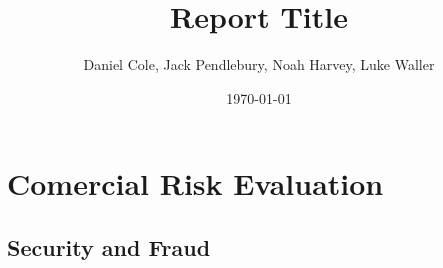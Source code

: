 \documentclass [12pt]{article}
\begin{document}
\title{\bf Report Title}
\author{Daniel Cole, Jack Pendlebury, Noah Harvey, Luke Waller}
\date{\today}
\maketitle
\thispagestyle{empty}

\newpage
{}
\setcounter{page}{1}
\tableofcontents
\newpage

\listoffigures
\listoftables

\newpage
\section{Comercial Risk Evaluation}\label{sec:Commercial_Risk}

\subsection{Security and Fraud}\label{sec:Security_and_Fraud}
\end{document}
